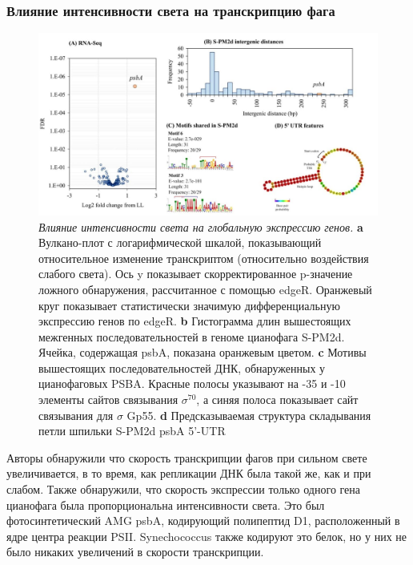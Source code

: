 \documentclass[14pt]{extarticle}
\begin{document}
    \begin{center}
        \item \subsubsection{Влияние интенсивности света на транскрипцию фага}
    \end{center}


    \begin{figure}[]
            \centering
            \includegraphics[width=\textwidth]{img/protein.jpg}
            \caption{\textit{Влияние интенсивности света на глобальную экспрессию генов.} \textbf{a} Вулкано-плот с
            логарифмической шкалой, показывающий относительное изменение транскриптом (относительно воздействия слабого
            света). Ось y показывает скорректированное p-значение ложного обнаружения, рассчитанное с помощью edgeR.
            Оранжевый круг показывает статистически значимую дифференциальную экспрессию генов по edgeR. \textbf{b}
            Гистограмма длин вышестоящих межгенных последовательностей в геноме цианофага S-PM2d. Ячейка, содержащая
            psbA, показана оранжевым цветом. \textbf{c} Мотивы вышестоящих последовательностей ДНК, обнаруженных у
            цианофаговых PSBA. Красные полосы указывают на -35 и -10 элементы сайтов связывания $\sigma^{70}$, а синяя
            полоса показывает сайт связывания для $\sigma$ Gp55. \textbf{d} Предсказываемая структура складывания петли
            шпильки S-PM2d psbA 5'-UTR \cite{puxty-evanx}}
            \label{fig:skybox}
    \end{figure}
    
    \par{Авторы обнаружили что скорость транскрипции фагов при сильном свете увеличивается, в то время, как репликации
    ДНК была такой же, как и при слабом. Также обнаружили, что скорость экспрессии только одного гена цианофага была
    пропорциональна интенсивности света. Это был фотосинтетический AMG psbA, кодирующий полипептид D1, расположенный в
    ядре центра реакции PSII. Synechococcus также кодируют это белок, но у них не было никаких увеличений в скорости 
    транскрипции. \cite{puxty-evanx}}
    
\end{document}
